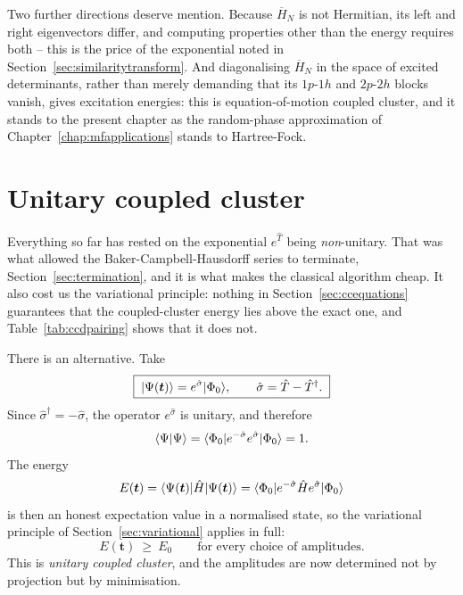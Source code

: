 Two further directions deserve mention.  Because $\overline{H}_N$ is not
Hermitian, its left and right eigenvectors differ, and computing properties
other than the energy requires both -- this is the price of the exponential
noted in Section~\ref{sec:similaritytransform}.  And diagonalising
$\overline{H}_N$ in the space of excited determinants, rather than merely
demanding that its $1p$-$1h$ and $2p$-$2h$ blocks vanish, gives excitation
energies: this is equation-of-motion coupled cluster, and it stands to the
present chapter as the random-phase approximation of
Chapter~\ref{chap:mfapplications} stands to Hartree-Fock.


\section{Unitary coupled cluster}
\label{sec:ucc}

Everything so far has rested on the exponential $e^{\hat{T}}$ being
\emph{non}-unitary.  That was what allowed the
Baker-Campbell-Hausdorff series to terminate,
Section~\ref{sec:termination}, and it is what makes the classical algorithm
cheap.  It also cost us the variational principle: nothing in
Section~\ref{sec:ccequations} guarantees that the coupled-cluster energy lies
above the exact one, and Table~\ref{tab:ccdpairing} shows that it does not.

There is an alternative.  Take
\begin{equation}
  \boxed{\;
  \vert \Psi(\bm{t}) \rangle = e^{\hat{\sigma}}\vert \Phi_0 \rangle,
  \qquad
  \hat{\sigma} = \hat{T}-\hat{T}^{\dagger} .
  \;}
  \label{eq:10-uccansatz}
\end{equation}
Since $\hat{\sigma}^{\dagger}=-\hat{\sigma}$, the operator
$e^{\hat{\sigma}}$ is unitary, and therefore
\begin{equation}
  \langle \Psi \vert \Psi \rangle
   = \langle \Phi_0 | e^{-\hat{\sigma}}e^{\hat{\sigma}} | \Phi_0 \rangle
   = 1 .
  \label{eq:10-uccnorm}
\end{equation}
The energy
\begin{equation}
  E(\bm{t}) = \langle \Psi(\bm{t}) | \hat{H} | \Psi(\bm{t}) \rangle
   = \langle \Phi_0 | e^{-\hat{\sigma}}\hat{H}e^{\hat{\sigma}} | \Phi_0 \rangle
  \label{eq:10-uccenergy}
\end{equation}
is then an honest expectation value in a normalised state, so the variational
principle of Section~\ref{sec:variational} applies in full:
\begin{equation}
  E(\bm{t}) \ \ge\ E_0
  \qquad\text{for every choice of amplitudes.}
  \label{eq:10-uccvariational}
\end{equation}
This is \emph{unitary coupled cluster}, and the amplitudes are now determined
not by projection but by minimisation.

